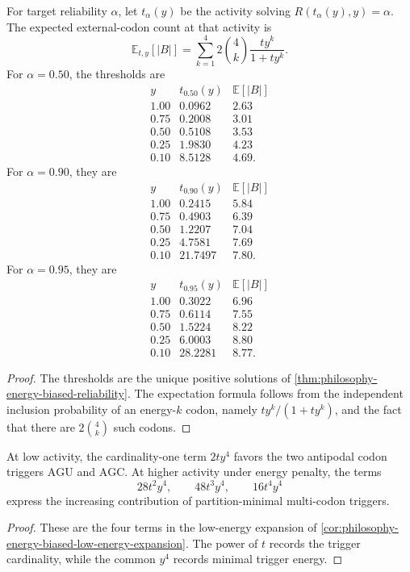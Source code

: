 \begin{theorem}
\label{thm:philosophy-energy-biased-threshold-table}
For target reliability $\alpha$, let $t_{\alpha}(y)$ be the activity
solving $R(t_{\alpha}(y),y)=\alpha$. The expected external-codon count
at that activity is
$$
  \mathbb{E}_{t,y}[|B|]
  =
  \sum_{k=1}^{4}
  2\binom{4}{k}
  \frac{t y^{k}}{1+t y^{k}}.
$$
For $\alpha=0.50$, the thresholds are
$$
\begin{array}{c|r|r}
  y & t_{0.50}(y) & \mathbb{E}[|B|]\\
  \hline
  1.00 & 0.0962 & 2.63\\
  0.75 & 0.2008 & 3.01\\
  0.50 & 0.5108 & 3.53\\
  0.25 & 1.9830 & 4.23\\
  0.10 & 8.5128 & 4.69.
\end{array}
$$
For $\alpha=0.90$, they are
$$
\begin{array}{c|r|r}
  y & t_{0.90}(y) & \mathbb{E}[|B|]\\
  \hline
  1.00 & 0.2415 & 5.84\\
  0.75 & 0.4903 & 6.39\\
  0.50 & 1.2207 & 7.04\\
  0.25 & 4.7581 & 7.69\\
  0.10 & 21.7497 & 7.80.
\end{array}
$$
For $\alpha=0.95$, they are
$$
\begin{array}{c|r|r}
  y & t_{0.95}(y) & \mathbb{E}[|B|]\\
  \hline
  1.00 & 0.3022 & 6.96\\
  0.75 & 0.6114 & 7.55\\
  0.50 & 1.5224 & 8.22\\
  0.25 & 6.0003 & 8.80\\
  0.10 & 28.2281 & 8.77.
\end{array}
$$
\end{theorem}
\begin{proof}
The thresholds are the unique positive solutions of
\autoref{thm:philosophy-energy-biased-reliability}. The expectation
formula follows from the independent inclusion probability of an
energy-$k$ codon, namely $t y^{k}/(1+t y^{k})$, and the fact that there
are $2\binom{4}{k}$ such codons.
\end{proof}

\begin{corollary}
\label{cor:philosophy-energy-biased-trigger-regimes}
At low activity, the cardinality-one term $2ty^{4}$ favors the two
antipodal codon triggers $\mathrm{AGU}$ and $\mathrm{AGC}$. At higher
activity under energy penalty, the terms
$$
  28t^{2}y^{4},\qquad
  48t^{3}y^{4},\qquad
  16t^{4}y^{4}
$$
express the increasing contribution of partition-minimal multi-codon
triggers.
\end{corollary}
\begin{proof}
These are the four terms in the low-energy expansion of
\autoref{cor:philosophy-energy-biased-low-energy-expansion}. The power
of $t$ records the trigger cardinality, while the common $y^{4}$ records
minimal trigger energy.
\end{proof}

